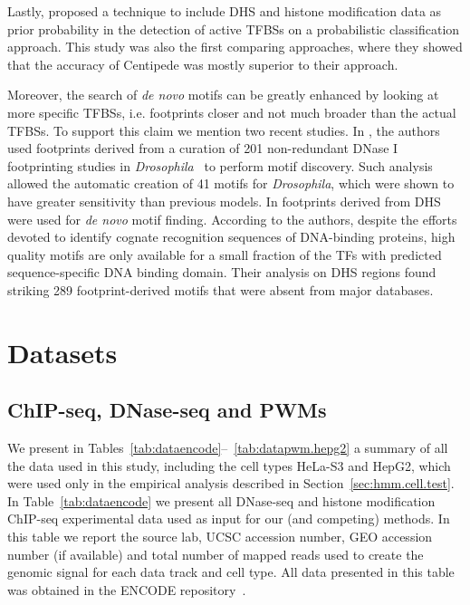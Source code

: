 \documentclass{bioinfo}
\begin{document}
Lastly, \cite{cuellar2012} proposed a technique to include
DHS and histone modification data as prior probability
in the detection of active TFBSs on a probabilistic
classification approach. This study was also the first comparing
approaches, where they showed that the accuracy of Centipede was
mostly superior to their approach.

Moreover, the search of \emph{de novo} motifs can be greatly enhanced
by looking at more specific TFBSs, i.e. footprints closer and
not much broader than the actual TFBSs. To support this claim
we mention two recent studies. In \cite{kulakovskiy2009}, the authors used
footprints derived from a curation of 201 non-redundant DNase I footprinting
studies in \emph{Drosophila}~\cite{bergman2005} to perform motif discovery.
Such analysis allowed the automatic creation of 41 motifs for \emph{Drosophila},
which were shown to have greater sensitivity than previous models. In \cite{neph2012a}
footprints derived from DHS were used for \emph{de novo} motif finding. According to the
authors, despite the efforts devoted to identify cognate recognition
sequences of DNA-binding proteins, high quality motifs are only available
for a small fraction of the TFs with predicted sequence-specific DNA binding
domain. Their analysis on DHS regions found striking 289 footprint-derived
motifs that were absent from major databases.

\section{Datasets}
\label{sec:datasets}

\subsection{ChIP-seq, DNase-seq and PWMs}

We present in Tables~\ref{tab:dataencode}--~\ref{tab:datapwm.hepg2} a
summary of all the data used in this study, including the cell types
HeLa-S3 and HepG2, which were used only in the empirical analysis
described in Section~\ref{sec:hmm.cell.test}. In Table~\ref{tab:dataencode}
we present all DNase-seq and histone modification ChIP-seq experimental data
used as input for our (and competing) methods. In this table we report
the source lab, UCSC accession number, GEO accession number (if available) and
total number of mapped reads used to create the genomic signal for each data
track and cell type. All data presented in this table was obtained in the
ENCODE repository~\citep{encode2012}.
\end{document}
